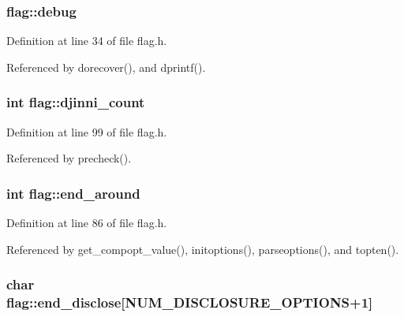 \hypertarget{structflag_ac2d732f796f18d283c1675e7fa3b7dd5}{
\subsubsection[{debug}]{ flag\+::debug}}\label{structflag_ac2d732f796f18d283c1675e7fa3b7dd5}


Definition at line 34 of file flag.\+h.



Referenced by dorecover(), and dprintf().

\hypertarget{structflag_a49bc19dacb9cf8ae7e97cf22bb964e2d}{
\subsubsection[{djinni\+\_\+count}]{\setlength{\rightskip}{0pt plus 5cm}int flag\+::djinni\+\_\+count}}\label{structflag_a49bc19dacb9cf8ae7e97cf22bb964e2d}


Definition at line 99 of file flag.\+h.



Referenced by precheck().

\hypertarget{structflag_ad980590820b88f01125262991dc438be}{
\subsubsection[{end\+\_\+around}]{\setlength{\rightskip}{0pt plus 5cm}int flag\+::end\+\_\+around}}\label{structflag_ad980590820b88f01125262991dc438be}


Definition at line 86 of file flag.\+h.



Referenced by get\+\_\+compopt\+\_\+value(), initoptions(), parseoptions(), and topten().

\hypertarget{structflag_ac299d5bda237844a96be2caf62346d60}{
\subsubsection[{end\+\_\+disclose}]{\setlength{\rightskip}{0pt plus 5cm}char flag\+::end\+\_\+disclose\mbox{[}{\bf N\+U\+M\+\_\+\+D\+I\+S\+C\+L\+O\+S\+U\+R\+E\+\_\+\+O\+P\+T\+I\+O\+N\+S}+1\mbox{]}}}\label{structflag_ac299d5bda237844a96be2caf62346d60}


